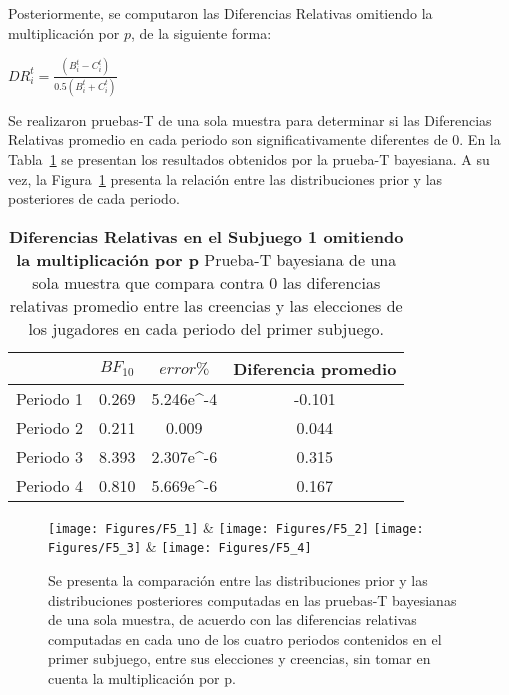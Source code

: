 Posteriormente, se computaron las Diferencias Relativas omitiendo la multiplicación por $p$, de la siguiente forma:\\

\begin{center}
$DR_i^t=  \frac{(B_i^t- C_i^t)}{0.5(B_i^t+ C_i^t)}$
\end{center}

Se realizaron pruebas-T de una sola muestra para determinar si las Diferencias Relativas promedio en cada periodo son significativamente diferentes de 0. En la Tabla~\ref{DRnop-S1-B} se presentan los resultados obtenidos por la prueba-T bayesiana. A su vez, la Figura~\ref{fig:DRnop_S1} presenta la relación entre las distribuciones prior y las posteriores de cada periodo.\\


\begin{table}[h]
\caption[Prueba t de una muestra: Diferencias Relativas en el Subjuego 1 sin la multiplicación por p]{\textbf{Diferencias Relativas en el Subjuego 1 omitiendo la multiplicación por p} Prueba-T bayesiana de una sola muestra que compara contra 0 las diferencias relativas promedio entre las creencias y las elecciones de los jugadores en cada periodo del primer subjuego.}
\label{DRnop-S1-B}
\centering
\begin{tabular}{l | c c | c}
\toprule
\textbf{} & \textbf{$BF_{10}$} & \textbf{$error\%$} & \textbf{Diferencia promedio}\\
\midrule
Periodo 1 & 0.269 & 5.246e^-4 & -0.101\\
Periodo 2 & 0.211 & 0.009 & 0.044\\
Periodo 3 & 8.393 & 2.307e^-6 & 0.315\\
Periodo 4 & 0.810 & 5.669e^-6 & 0.167\\
\bottomrule
\end{tabular}
\end{table}
	

\begin{figure}[hp]
\centering
\texttt{[image: Figures/F5\_1]} & \texttt{[image: Figures/F5\_2]} 
\texttt{[image: Figures/F5\_3]} & \texttt{[image: Figures/F5\_4]} 
\decoRule
\caption[Evaluación de las Diferencias Relativas entre creencias y elecciones en el Subjuego 1 sin la multiplicación por p (Factor de Bayes)]{Se presenta la comparación entre las distribuciones prior y las distribuciones posteriores computadas en las pruebas-T bayesianas de una sola muestra, de acuerdo con las diferencias relativas computadas en cada uno de los cuatro periodos contenidos en el primer subjuego, entre sus elecciones y creencias, sin tomar en cuenta la multiplicación por p.}
\label{fig:DRnop_S1}
\end{figure}


